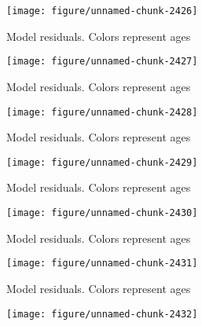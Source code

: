 \documentclass[a4paper]{article}\usepackage{graphicx, color}
\makeatletter
\def\maxwidth{ %
  \ifdim\Gin@nat@width>\linewidth
    \linewidth
  \else
    \Gin@nat@width
  \fi
}
\newenvironment{knitrout}{}{} %
\makeatother
\begin{document}
\begin{knitrout}
\begin{figure}[H]
{\centering \texttt{[image: figure/unnamed-chunk-2426]} 

}

\caption[Model residuals]{Model residuals. Colors represent ages\label{fig:unnamed-chunk-2426}}
\end{figure}
\begin{figure}[H]


{\centering \texttt{[image: figure/unnamed-chunk-2427]} 

}

\caption[Model residuals]{Model residuals. Colors represent ages\label{fig:unnamed-chunk-2427}}
\end{figure}
\begin{figure}[H]


{\centering \texttt{[image: figure/unnamed-chunk-2428]} 

}

\caption[Model residuals]{Model residuals. Colors represent ages\label{fig:unnamed-chunk-2428}}
\end{figure}
\begin{figure}[H]


{\centering \texttt{[image: figure/unnamed-chunk-2429]} 

}

\caption[Model residuals]{Model residuals. Colors represent ages\label{fig:unnamed-chunk-2429}}
\end{figure}
\begin{figure}[H]


{\centering \texttt{[image: figure/unnamed-chunk-2430]} 

}

\caption[Model residuals]{Model residuals. Colors represent ages\label{fig:unnamed-chunk-2430}}
\end{figure}
\begin{figure}[H]


{\centering \texttt{[image: figure/unnamed-chunk-2431]} 

}

\caption[Model residuals]{Model residuals. Colors represent ages\label{fig:unnamed-chunk-2431}}
\end{figure}
\begin{figure}[H]


{\centering \texttt{[image: figure/unnamed-chunk-2432]} 

}


\end{figure}
\end{knitrout}
\end{document}
